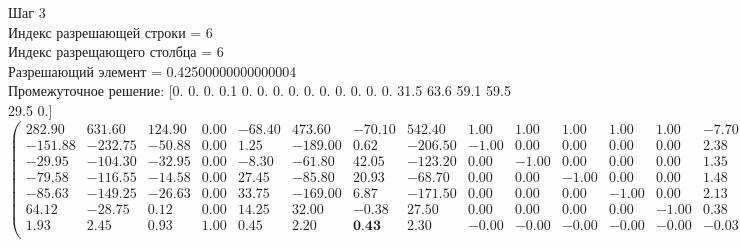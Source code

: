 \documentclass[draft]{article}
\begin{document}
\begin{flushleft}
    Шаг 3 \\
    Индекс разрешающей строки = 6\\
    Индекс разрещающего столбца = 6\\
    Разрешающий элемент = 0.42500000000000004\\
    Промежуточное решение:
    [0.  0.  0.  0.1  0.  0.  0.  0.  0.  0.  0.  0.  0.  0.  31.5  63.6  59.1  59.5  29.5  0.]
\begin{equation*}
\begin{pmatrix}
    282.90 &  631.60 & 124.90 & 0.00 & -68.40 &  473.60 & -70.10 &  542.40 &  1.00 &  1.00 &  1.00 &  1.00 &  1.00 & -7.70 & 0.00 & 0.00 & 0.00 & 0.00 & 0.00 &  8.70 & -243.20 \\
    -151.88 & -232.75 & -50.88 & 0.00 &   1.25 & -189.00 &   0.62 & -206.50 & -1.00 &  0.00 &  0.00 &  0.00 &  0.00 &  2.38 & 1.00 & 0.00 & 0.00 & 0.00 & 0.00 & -2.38 &   31.50 \\
    -29.95 & -104.30 & -32.95 & 0.00 &  -8.30 &  -61.80 &  42.05 & -123.20 &  0.00 & -1.00 &  0.00 &  0.00 &  0.00 &  1.35 & 0.00 & 1.00 & 0.00 & 0.00 & 0.00 & -1.35 &   63.60 \\
    -79.58 & -116.55 & -14.58 & 0.00 &  27.45 &  -85.80 &  20.93 &  -68.70 &  0.00 &  0.00 & -1.00 &  0.00 &  0.00 &  1.48 & 0.00 & 0.00 & 1.00 & 0.00 & 0.00 & -1.48 &   59.10 \\
    -85.63 & -149.25 & -26.63 & 0.00 &  33.75 & -169.00 &   6.87 & -171.50 &  0.00 &  0.00 &  0.00 & -1.00 &  0.00 &  2.13 & 0.00 & 0.00 & 0.00 & 1.00 & 0.00 & -2.13 &   59.50 \\
    64.12 &  -28.75 &   0.12 & 0.00 &  14.25 &   32.00 &  -0.38 &   27.50 &  0.00 &  0.00 &  0.00 &  0.00 & -1.00 &  0.38 & 0.00 & 0.00 & 0.00 & 0.00 & 1.00 & -0.38 &   29.50 \\
    1.93 &    2.45 &   0.93 & 1.00 &   0.45 &    2.20 &   \textbf{0.43} &    2.30 & -0.00 & -0.00 & -0.00 & -0.00 & -0.00 & -0.03 & 0.00 & 0.00 & 0.00 & 0.00 & 0.00 &  0.03 &    0.10 \\
\end{pmatrix}
\end{equation*}
\end{flushleft}
\end{document}

